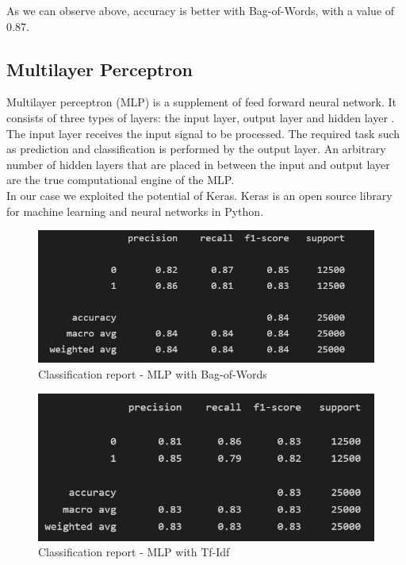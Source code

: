 \documentclass[fleqn,10pt]{SelfArx} %
\begin{document}
As we can observe above, accuracy is better with Bag-of-Words, with a value of 0.87.

\subsection{Multilayer Perceptron}
Multilayer perceptron (MLP) is a supplement of feed forward neural network. It consists of three types of layers: the input layer, output layer and hidden layer \cite{MLP}.\\
The input layer receives the input signal to be processed. The required task such as prediction and classification is performed by the output layer. An arbitrary number of hidden layers that are placed in between the input and output layer are the true computational engine of the MLP.\\
In our case we exploited the potential of Keras. Keras is an open source library for machine learning and neural networks in Python.

\begin{figure}[H]
\begin{center}
  \includegraphics[scale=0.6]{./images/MLP_BoW.png}
\end{center}
  \caption{Classification report - MLP with Bag-of-Words}
\end{figure}

\begin{figure}[H]
\begin{center}
  \includegraphics[scale=0.6]{./images/MLP_TFIDF.png}
\end{center}
  \caption{Classification report - MLP with Tf-Idf}
\end{figure}
\end{document}
